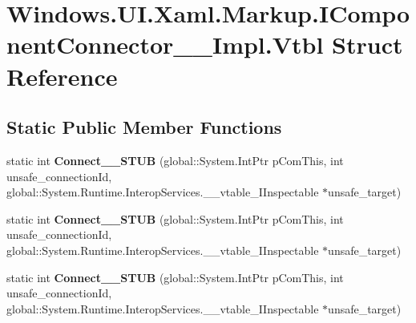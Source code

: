 \hypertarget{struct_windows_1_1_u_i_1_1_xaml_1_1_markup_1_1_i_component_connector_____impl_1_1_vtbl}{}\section{Windows.\+U\+I.\+Xaml.\+Markup.\+I\+Component\+Connector\+\_\+\+\_\+\+Impl.\+Vtbl Struct Reference}
\label{struct_windows_1_1_u_i_1_1_xaml_1_1_markup_1_1_i_component_connector_____impl_1_1_vtbl}
\subsection*{Static Public Member Functions}
\begin{DoxyCompactItemize}
\item 
\mbox{\label{struct_windows_1_1_u_i_1_1_xaml_1_1_markup_1_1_i_component_connector_____impl_1_1_vtbl_a0d1abbe4d861132c7a7441f6d127930f}} 
static int {\bfseries Connect\+\_\+\+\_\+\+S\+T\+UB} (global\+::\+System.\+Int\+Ptr p\+Com\+This, int unsafe\+\_\+connection\+Id, global\+::\+System.\+Runtime.\+Interop\+Services.\+\_\+\+\_\+vtable\+\_\+\+I\+Inspectable $\ast$unsafe\+\_\+target)
\item 
\mbox{\label{struct_windows_1_1_u_i_1_1_xaml_1_1_markup_1_1_i_component_connector_____impl_1_1_vtbl_a0d1abbe4d861132c7a7441f6d127930f}} 
static int {\bfseries Connect\+\_\+\+\_\+\+S\+T\+UB} (global\+::\+System.\+Int\+Ptr p\+Com\+This, int unsafe\+\_\+connection\+Id, global\+::\+System.\+Runtime.\+Interop\+Services.\+\_\+\+\_\+vtable\+\_\+\+I\+Inspectable $\ast$unsafe\+\_\+target)
\item 
\mbox{\label{struct_windows_1_1_u_i_1_1_xaml_1_1_markup_1_1_i_component_connector_____impl_1_1_vtbl_a0d1abbe4d861132c7a7441f6d127930f}} 
static int {\bfseries Connect\+\_\+\+\_\+\+S\+T\+UB} (global\+::\+System.\+Int\+Ptr p\+Com\+This, int unsafe\+\_\+connection\+Id, global\+::\+System.\+Runtime.\+Interop\+Services.\+\_\+\+\_\+vtable\+\_\+\+I\+Inspectable $\ast$unsafe\+\_\+target)

\end{DoxyCompactItemize}

